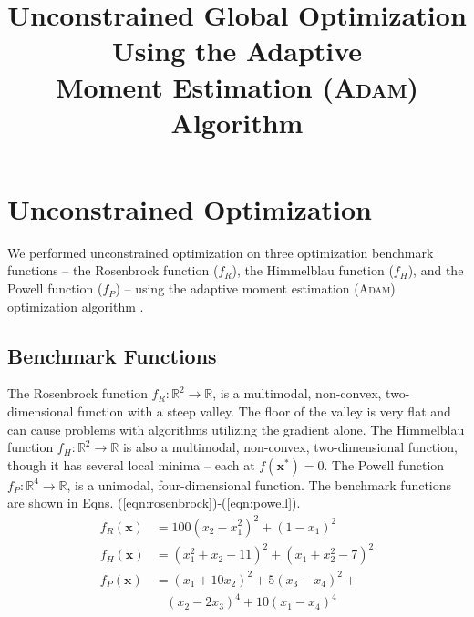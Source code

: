 \documentclass[conference]{IEEEtran}
\begin{document}
\title{\LARGE \textbf{Unconstrained Global Optimization Using the Adaptive \\ Moment Estimation (\textsc{Adam}) Algorithm} 
}


\author{
} %


\maketitle

\section{Unconstrained Optimization}

We performed unconstrained optimization on three optimization benchmark functions -- the Rosenbrock function ($f_R$), the Himmelblau function ($f_H$), and the Powell function ($f_P$) \cite{Rosenbrock1960AnFunction,Himmelblau1972AppliedProgramming,Powell1962AnVariables} -- using the adaptive moment estimation (\textsc{Adam}) optimization algorithm \cite{Kingma2015Adam:Optimization}.

\subsection{Benchmark Functions}

The Rosenbrock function $f_R:\mathbb{R}^2 \rightarrow \mathbb{R}$, is a multimodal, non-convex, two-dimensional function with a steep valley. The floor of the valley is very flat and can cause problems with algorithms utilizing the gradient alone. The Himmelblau function $f_H:\mathbb{R}^2 \rightarrow \mathbb{R}$ is also a multimodal, non-convex, two-dimensional function, though it has several local minima -- each at $f(\textbf{x}^*)=0$. The Powell function $f_P:\mathbb{R}^4 \rightarrow \mathbb{R}$, is a unimodal, four-dimensional function. The benchmark functions are shown in Eqns. (\ref{eqn:rosenbrock})-(\ref{eqn:powell}).
\begin{align}
    f_R(\textbf{x}) &= 100(x_2-x_1^2)^2 + (1-x_1)^2
    \label{eqn:rosenbrock} \\
    f_H(\textbf{x}) &= (x_1^{2}+x_2-11)^{2}+(x_1+x_2^{2}-7)^{2}
    \label{eqn:himmelblau} \\
    f_P(\textbf{x}) &= (x_1 + 10x_2)^2 + 5(x_3-x_4)^2 + \nonumber \\ 
                    & ~~~~(x_2-2x_3)^4 + 10(x_1-x_4)^4
    \label{eqn:powell} 
\end{align}
\end{document}
